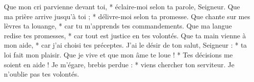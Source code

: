 Que mon cri parvienne devant toi, *
éclaire-moi selon ta parole, Seigneur.
\versseparator
Que ma prière arrive jusqu’à toi ; *
délivre-moi selon ta promesse.
\versseparator
Que chante sur mes lèvres ta louange, *
car tu m’apprends tes commandements.
\versseparator
Que ma langue redise tes promesses, *
car tout est justice en tes volontés.
\versseparator
Que ta main vienne à mon aide, *
car j’ai choisi tes préceptes.
\versseparator
J’ai le désir de ton salut, Seigneur : *
ta loi fait mon plaisir.
\versseparator
Que je vive et que mon âme te loue ! *
Tes décisions me soient en aide !
\versseparator
Je m’égare, brebis perdue : *
viens chercher ton serviteur.
Je n’oublie pas tes volontés.
